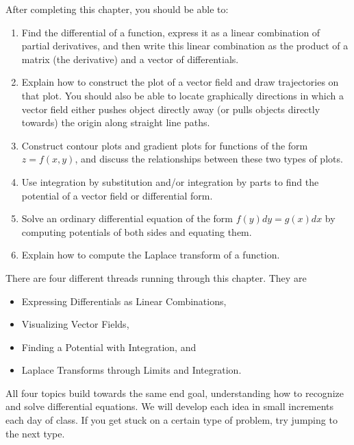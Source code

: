 \newcommand{\urlvectorfieldplotter}{http://bmw.byuimath.com/dokuwiki/doku.php?id=vector_field_plotter}
\newcommand{\urllevelcurveplotter}{http://bmw.byuimath.com/dokuwiki/doku.php?id=level_curve_plotter}
\newcommand{\urlpotentialcalculator}{http://bmw.byuimath.com/dokuwiki/doku.php?id=potential_calculator}
\newcommand{\urlparametriccurveplotter}{http://bmw.byuimath.com/dokuwiki/doku.php?id=parametric_curve_plotter}
\newcommand{\urlfirstorderodesolver}{http://bmw.byuimath.com/dokuwiki/doku.php?id=first_order_ode_solver}

\newcommand{\ideaA}{Expressing Differentials as Linear Combinations}
\newcommand{\ideaB}{Visualizing Vector Fields}
\newcommand{\ideaC}{Finding a Potential with Integration}
\newcommand{\ideaD}{Laplace Transforms through Limits and Integration}

After completing this chapter, you should be able to:
\begin{enumerate}
 \item Find the differential of a function, express it as a linear combination of partial derivatives, and then write this linear combination as the product of a matrix (the derivative) and a vector of differentials.
 \item Explain how to construct the plot of a vector field and draw trajectories on that plot. You should also be able to locate graphically directions in which a vector field either pushes object directly away (or pulls objects directly towards) the origin along straight line paths.
 \item Construct contour plots and gradient plots for functions of the form $z=f(x,y)$, and discuss the relationships between these two types of plots.  
 \item Use integration by substitution and/or integration by parts to find the potential of a vector field or differential form.
 \item Solve an ordinary differential equation of the form $f(y)dy = g(x)dx$ by computing potentials of both sides and equating them.
 \item Explain how to compute the Laplace transform of a function.
\end{enumerate}
There are four different threads running through this chapter.  They are
\begin{itemize}
 \item \ideaA,
 \item \ideaB,
 \item \ideaC, and
 \item \ideaD.
\end{itemize}
All four topics build towards the same end goal, understanding how to recognize and solve differential equations. We will develop each idea in small increments each day of class. If you get stuck on a certain type of problem, try jumping to the next type.

